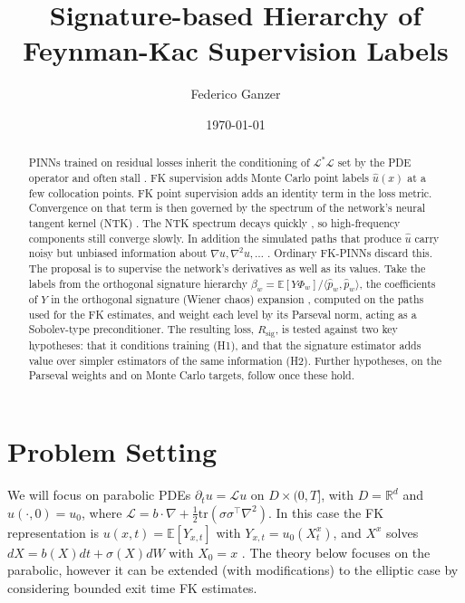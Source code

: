 \documentclass[english]{article}
\newenvironment{summary}{%
  \begingroup
  \renewcommand{\abstractname}{Summary}%
  \begin{abstract}
}{%
  \end{abstract}
  \endgroup
}
\begin{document}
\title{\vspace{-1cm}Signature-based Hierarchy of Feynman-Kac Supervision Labels}
\author{Federico Ganzer}
\date{\today}
\maketitle
\begin{summary}
 PINNs trained on residual losses inherit the conditioning of $\mathcal{L}^*\mathcal{L}$ set by the PDE operator and often stall \cite{deryck2024operator}. FK supervision \cite{tepakbong2026taming} adds Monte Carlo point labels $\hat u (x)$ at a few collocation points. FK point supervision adds an identity term in the loss metric. Convergence on that term is then governed by the spectrum of the network's neural tangent kernel (NTK) \cite{jacot2018ntk}. The NTK spectrum decays quickly \cite{rahaman2019spectral}, so high-frequency components still converge slowly. In addition the simulated paths that produce $\hat u$ carry noisy but unbiased information about $\nabla u, \nabla^2u, \dots $ . Ordinary FK-PINNs discard this. The proposal is to supervise the network's derivatives as well as its values. Take the labels from the orthogonal signature hierarchy $\beta_w = \mathbb{E}[Y\Phi_w]/\langle\hat{p}_w,\hat{p}_w\rangle$, the coefficients of $Y$ in the orthogonal signature (Wiener chaos) expansion \cite{chevyrev2026orthogonal}, computed on the paths used for the FK estimates, and weight each level by its Parseval norm, acting as a Sobolev-type preconditioner. The resulting loss, $R_\mathrm{sig}$, is tested against two key hypotheses: that it conditions training (H1), and that the signature estimator adds value over simpler estimators of the same information (H2). Further hypotheses, on the Parseval weights and on Monte Carlo targets, follow once these hold.
\end{summary}

\section{Problem Setting}\label{sec:setting}
We will focus on parabolic PDEs $\partial_t u = \mathcal{L}u$ on $D\times(0,T]$, with $D=\mathbb R^d$ and $u(\cdot,0)=u_0$, where $\mathcal{L} = b\cdot\nabla + \frac{1}{2} \mathrm{tr}(\sigma\sigma^\top \nabla^2)$. In this case the FK representation is $u(x, t) = \mathbb{E}[Y_{x,t}]$ with $Y_{x,t} = u_0(X^x_t)$, and $X^x$ solves $dX = b(X)dt + \sigma(X)dW$ with $X_0 = x$ \cite{oksendal2003sde,karatzas1991brownian}. The theory below focuses on the parabolic, however it can be extended (with modifications) to the elliptic case by considering bounded exit time FK estimates.
\end{document}
